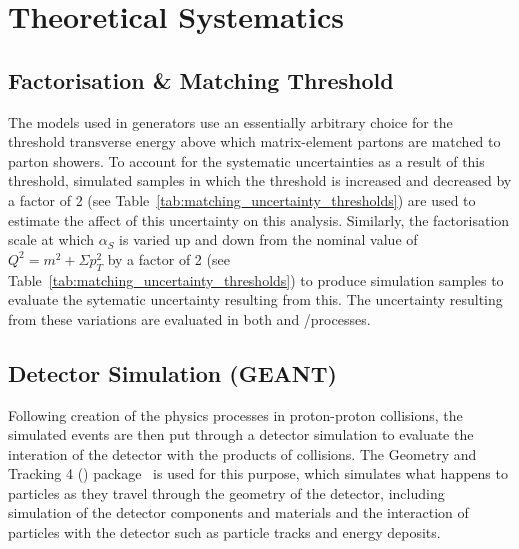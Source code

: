 
\section{Theoretical Systematics}
\label{s:Theoretical Systematics}
\subsection{Factorisation \& Matching Threshold}
\label{ss:factorisation_and_matching_threshold}
The models used in generators use an essentially arbitrary choice for the threshold transverse energy above
which matrix-element partons are matched to parton showers. To account for the systematic uncertainties as a result
of this threshold, simulated samples in which the threshold is increased and decreased by a factor of 2 (see
Table~\ref{tab:matching_uncertainty_thresholds}) are used to estimate the affect of this uncertainty on this
analysis. Similarly, the factorisation scale at which $\alpha_{S}$ is varied up and down from the nominal
value of $Q^{2} = m^{2} + \Sigma p_{T}^{2}$ by a factor of 2 (see Table~\ref{tab:matching_uncertainty_thresholds}) to
produce simulation samples to evaluate the sytematic uncertainty resulting from this. The uncertainty
resulting from these variations are evaluated in both \ttbar and \W/\ZpJets processes.



\subsection{Detector Simulation (GEANT)}
\label{ss:detector_simulation}
Following creation of the physics processes in proton-proton collisions, the simulated events are then put
through a detector simulation to evaluate the interation of the detector with the products of collisions. The
Geometry and Tracking 4 (\GEANTfour) package~\cite{Agostinelli:2002hh,Allison:2006ve} is used for this
purpose, which simulates what happens to particles as they travel through the geometry of the detector,
including simulation of the detector components and materials and the interaction of particles with the
detector such as particle tracks and energy deposits.